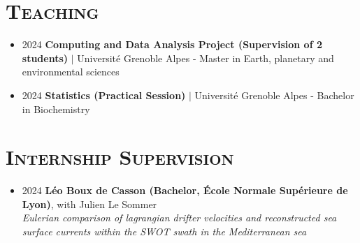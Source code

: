 \documentclass{article}
\begin{document}
\section*{\textsc{Teaching}}
\begin{itemize}
    \item[] 2024 \tabto{2cm} \textbf{Computing and Data Analysis Project (Supervision of 2 students)} $\vert$ Université Grenoble Alpes - \tabto{2cm} Master in Earth, planetary and environmental sciences
    \item[] 2024 \tabto{2cm} \textbf{Statistics (Practical Session)} $\vert$ Université Grenoble Alpes - Bachelor in Biochemistry
\end{itemize}

\section*{\textsc{Internship Supervision}}
\begin{itemize}
    \item[] 2024 \tabto{2cm} \textbf{Léo Boux de Casson (Bachelor, École Normale Supérieure de Lyon)}, with Julien Le Sommer \\[.1 cm]
    \tabto{2cm} \textit{Eulerian comparison of lagrangian drifter velocities and reconstructed sea surface currents within the \tabto{2cm} SWOT swath in the Mediterranean sea}
\end{itemize}
\end{document}
